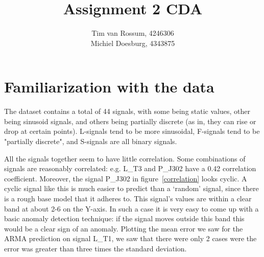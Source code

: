 \documentclass[]{article}
\title{Assignment 2 CDA}
\author{Tim van Rossum, 4246306\\
	Michiel Doesburg, 4343875}
\begin{document}
\maketitle
\section{Familiarization with the data}
The dataset contains a total of 44 signals, with some being static values, other being sinusoid signals, and others being partially discrete (as in, they can rise or drop at certain points). L-signals tend to be more sinusoidal, F-signals tend to be "partially discrete", and S-signals are all binary signals.

All the signals together seem to have little correlation. Some combinations of signals are reasonably correlated: e.g. L\_T3 and P\_J302 have a 0.42 correlation coefficient. Moreover, the signal P\_J302 in figure~\ref{correlation} looks cyclic. A cyclic signal like this is much easier to predict than a `random' signal, since there is a rough base model that it adheres to. This signal's values are within a clear band at about 2-6 on the Y-axis. In such a case it is very easy to come up with a basic anomaly detection technique: if the signal moves outside this band this would be a clear sign of an anomaly. Plotting the mean error we saw for the ARMA prediction on signal L\_T1, we saw that there were only 2 cases were the error was greater than three times the standard deviation. 
\end{document}
